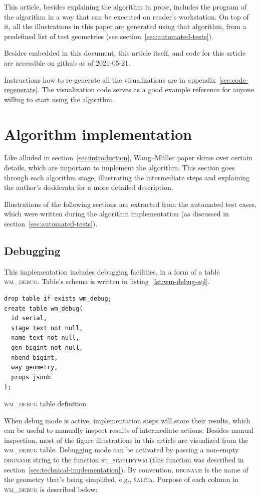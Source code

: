 \documentclass[a4paper]{article}
\newcommand{\WM}{Wang--M{\"u}ller}
\begin{document}
This article, besides explaining the algorithm in prose, includes the program
of the algorithm in a way that can be executed on reader's workstation. On top
of it, all the illustrations in this paper are generated using that algorithm,
from a predefined list of test geometries (see
section~\ref{sec:automated-tests}).

Besides embedded in this document, this article itself, and code for this
article are accessible on github as of 2021-05-21\cite{wmsql}.

Instructions how to re-generate all the visualizations are in
appendix~\ref{sec:code-regenerate}. The visualization code serves as a good
example reference for anyone willing to start using the algorithm.

\section{Algorithm implementation}

Like alluded in section~\ref{sec:introduction}, {\WM} paper skims over
certain details, which are important to implement the algorithm. This section
goes through each algorithm stage, illustrating the intermediate steps and
explaining the author's desiderata for a more detailed description.

Illustrations of the following sections are extracted from the automated test
cases, which were written during the algorithm implementation (as discussed in
section~\ref{sec:automated-tests}).

\subsection{Debugging}
\label{sec:debugging}

This implementation includes debugging facilities, in a form of a table
\textsc{wm\_debug}. Table's schema is written in
listing~\ref{lst:wm-debug-sql}.

\begin{listing}[h]
    \begin{verbatim}
drop table if exists wm_debug;
create table wm_debug(
  id serial,
  stage text not null,
  name text not null,
  gen bigint not null,
  nbend bigint,
  way geometry,
  props jsonb
);
    \end{verbatim}
    \caption{\textsc{wm\_debug} table definition}
    \label{lst:wm-debug-sql}
\end{listing}

When debug mode is active, implementation steps will store their results, which
can be useful to manually inspect results of intermediate actions. Besides
manual inspection, most of the figure illustrations in this article are
visualized from the \textsc{wm\_debug} table. Debugging mode can be activated
by passing a non-empty \textsc{dbgname} string to the function
\textsc{st\_simplifywm} (this function was described in
section~\ref{sec:technical-implementation}). By convention, \textsc{dbgname} is
the name of the geometry that's being simplified, e.g., \textsc{šalčia}.
Purpose of each column in \textsc{wm\_debug} is described below:
\end{document}
